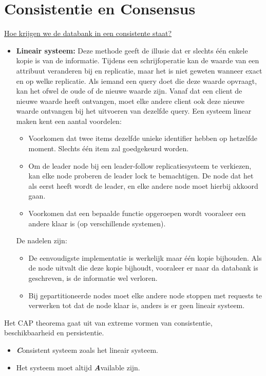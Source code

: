 	\section{Consistentie en Consensus}
	\underline{Hoe krijgen we de databank in een consistente staat?}
	\begin{itemize}
		\item  \textbf{Lineair systeem:} Deze methode geeft de illusie dat er slechts één enkele kopie is van de informatie. Tijdens een schrijfoperatie kan de waarde van een attribuut veranderen bij en replicatie, maar het is niet geweten wanneer exact en op welke replicatie. Als iemand een query doet die deze waarde opvraagt, kan het ofwel de oude of de nieuwe waarde zijn. Vanaf dat een client de nieuwe waarde heeft ontvangen, moet elke andere client ook deze nieuwe waarde ontvangen bij het uitvoeren van dezelfde query. Een systeem linear maken kent een aantal voordelen:
		\begin{itemize}
			\item[\good] Voorkomen dat twee items dezelfde unieke identifier hebben op hetzelfde moment. Slechts één item zal goedgekeurd worden.
			\item[\good] Om de leader node bij een leader-follow replicatiesysteem te verkiezen, kan elke node proberen de leader lock te bemachtigen. De node dat het als eerst heeft wordt de leader, en elke andere node moet hierbij akkoord gaan.
			\item[\good] Voorkomen dat een bepaalde functie opgeroepen wordt vooraleer een andere klaar is (op verschillende systemen).
		\end{itemize}
		De nadelen zijn:
		\begin{itemize}
			\item[\alert] De eenvoudigste implementatie is werkelijk maar één kopie bijhouden. Als de node uitvalt die deze kopie bijhoudt, vooraleer er naar da databank is geschreven, is de informatie wel verloren.
			\item[\alert] Bij gepartitioneerde nodes moet elke andere node stoppen met requests te verwerken tot dat de node klaar is, anders is er geen lineair systeem.
		\end{itemize}
	\end{itemize}

	Het CAP theorema gaat uit van extreme vormen van consistentie, beschikbaarheid en persistentie.
	\begin{itemize}
		\item \emph{\textbf{C}}onsistent systeem zoals het lineair systeem.
		\item  Het systeem moet altijd \emph{\textbf{A}}vailable zijn.
	\end{itemize}
	
